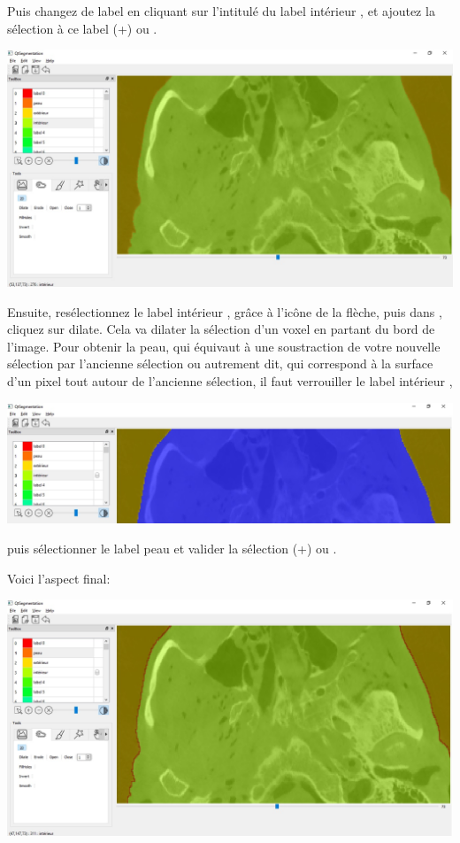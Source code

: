 \documentclass {article}
\begin{document}
Puis changez de label en cliquant sur l'intitulé du label \og intérieur \fg , et ajoutez la sélection à ce label (+) ou .

\begin{center}
\includegraphics[scale=0.5]{Iconographie/Exemple_1_4.jpg}
\end{center}

Ensuite, resélectionnez le label \og intérieur \fg , grâce à l'icône de la flèche, puis dans , cliquez sur dilate. Cela va dilater la sélection d'un voxel en partant du bord de l'image. Pour obtenir la peau, qui équivaut à une soustraction de votre nouvelle sélection par l'ancienne sélection ou autrement dit, qui correspond à la surface d'un pixel tout autour de l'ancienne sélection, il faut verrouiller le label \og intérieur \fg ,

\begin{center}
\includegraphics[scale=0.5]{Iconographie/Exemple_1_5.jpg}
\end{center}

puis sélectionner le label \og peau \fg et valider la sélection (+) ou .

Voici l'aspect final:

\begin{center}
\includegraphics[scale=0.5]{Iconographie/Exemple_1_6.jpg}
\end{center}
\end{document}
